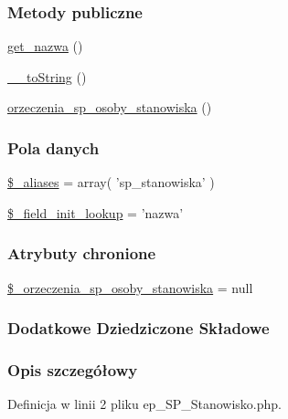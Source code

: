 \subsubsection*{Metody publiczne}
\begin{DoxyCompactItemize}
\item 
\hyperlink{classep___s_p___stanowisko_ac0818f0049d7b84f08f77128f54cee36}{get\-\_\-nazwa} ()
\item 
\hyperlink{classep___s_p___stanowisko_a7516ca30af0db3cdbf9a7739b48ce91d}{\-\_\-\-\_\-to\-String} ()
\item 
\hyperlink{classep___s_p___stanowisko_a7f13cc1eeb3f1510b76d5fccde5bfdad}{orzeczenia\-\_\-sp\-\_\-osoby\-\_\-stanowiska} ()
\end{DoxyCompactItemize}
\subsubsection*{Pola danych}
\begin{DoxyCompactItemize}
\item 
\hyperlink{classep___s_p___stanowisko_ab4e31d75f0bc5d512456911e5d01366b}{\$\-\_\-aliases} = array( 'sp\-\_\-stanowiska' )
\item 
\hyperlink{classep___s_p___stanowisko_a4a4d54ae35428077a7c61ec8a5139af3}{\$\-\_\-field\-\_\-init\-\_\-lookup} = 'nazwa'
\end{DoxyCompactItemize}
\subsubsection*{Atrybuty chronione}
\begin{DoxyCompactItemize}
\item 
\hyperlink{classep___s_p___stanowisko_a96932ccc35af06bdee80dc8ce108397e}{\$\-\_\-orzeczenia\-\_\-sp\-\_\-osoby\-\_\-stanowiska} = null
\end{DoxyCompactItemize}
\subsubsection*{Dodatkowe Dziedziczone Składowe}


\subsubsection{Opis szczegółowy}


Definicja w linii 2 pliku ep\-\_\-\-S\-P\-\_\-\-Stanowisko.\-php.



